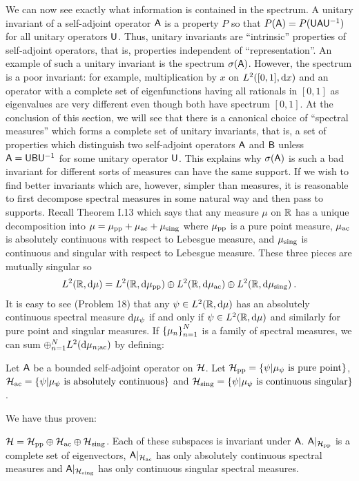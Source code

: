 We can now see exactly what information is contained in the spectrum. A unitary invariant of a self-adjoint operator $\mathsf{A}$ is a property $P$ so that $P(\mathsf{A}) = P(\mathsf{U} \mathsf{A} \mathsf{U}^{-1})$ for all unitary operators $\mathsf{U}$. Thus, unitary invariants are \enquote{intrinsic} properties of self-adjoint operators, that is, properties independent of \enquote{representation}. An example of such a unitary invariant is the spectrum $\sigma( \mathsf{A})$. However, the spectrum is a poor invariant: for example, multiplication by $x$ on $L^{2}([0,1], \mathrm{d} x)$ and an operator with a complete set of eigenfunctions having all rationals in $[0, 1]$ as eigenvalues are very different even though both have spectrum $[0, 1]$.
At the conclusion of this section, we will see that there is a canonical choice of “spectral measures” which forms a complete set of unitary invariants, that is, a set of properties which distinguish two self-adjoint operators $\mathsf{A}$ and $\mathsf{B}$ unless $\mathsf{A} = \mathsf{U} \mathsf{B} \mathsf{U}^{-1} $ for some unitary operator $\mathsf{U}$. This explains why $\sigma (\mathsf{A})$ is such a bad invariant for different sorts of measures can have the same support. If we wish to find better invariants which are, however, simpler than measures, it is reasonable to first decompose spectral measures in some natural way and then pass to supports.
Recall Theorem I.13 which says that any measure $\mu$ on $\mathbb{R}$ has a unique decomposition into $\mu = \mu_{\mathrm{pp}} + \mu_{\mathrm{ac}} + \mu_{\mathrm{sing}} $ where $\mu_{\mathrm{pp}}$ is a pure point measure, $\mu_{\mathrm{ac}}$ is absolutely continuous with respect to Lebesgue measure, and $\mu_{\mathrm{sing}}$ is continuous and singular with respect to Lebesgue measure. These three pieces are mutually singular so
\begin{align}
    L^{2}(\mathbb{R}, \mathrm{d} \mu) = L^{2}(\mathbb{R}, \mathrm{d} \mu_{\mathrm{pp}}) \oplus L^{2}(\mathbb{R}, \mathrm{d} \mu_{\mathrm{ac}}) \oplus L^{2}(\mathbb{R}, \mathrm{d} \mu_{\mathrm{sing}}) \:.
\end{align}
It is easy to see (Problem 18) that any $\psi \in L^{2}(\mathbb{R}, \mathrm{d} \mu)$ has an absolutely continuous spectral measure $\mathrm{d} \mu_\psi$ if and only if $\psi \in L^{2}(\mathbb{R}, \mathrm{d} \mu)$ and similarly for pure point and singular measures. If $\left \lbrace \mu_n \right \rbrace_{n=1}^N$ is a family of spectral measures, we can sum $\oplus_{n=1}^N L^{2}(\mathrm{d} \mu_{n ; \mathrm{ac}})$ by defining:

\begin{definition}
    Let $\mathsf{A}$ be a bounded self-adjoint operator on $\mathcal{H}$. Let $\mathcal{H}_{\mathrm{pp}} = \left \lbrace \psi | \mu_\psi \text{ is pure point} \right \rbrace$, $\mathcal{H}_{\mathrm{ac}} = \left \lbrace \psi | \mu_\psi \text{ is absolutely continuous} \right \rbrace$ and $ \mathcal{H}_{\mathrm{sing}} = \left \lbrace \psi | \mu_\psi \text{ is continuous singular} \right \rbrace$.
\end{definition}

We have thus proven:

\begin{theorem}
    $\mathcal{H} = \mathcal{H}_{\mathrm{pp}} \oplus \mathcal{H}_{\mathrm{ac}} \oplus \mathcal{H}_{\mathrm{sing}}$. Each of these subspaces is invariant under $\mathsf{A}$. $\mathsf{A}|_{\mathcal{H}_{\mathrm{pp}}}$ is a complete set of eigenvectors, $\mathsf{A}|_{\mathcal{H}_{\mathrm{ac}}}$ has only absolutely continuous spectral measures and $\mathsf{A}|_{\mathcal{H}_{\mathrm{sing}}}$ has only continuous singular spectral measures.
\end{theorem}